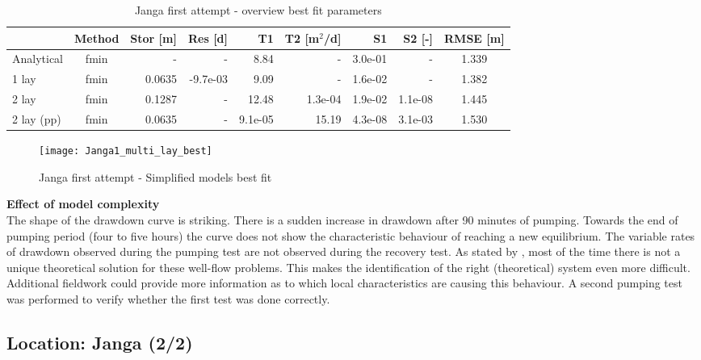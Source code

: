 \begin{table}[h!]
\small
\centering
\caption{Janga first attempt - overview best fit parameters}
\label{tab:Janga1_table}
\begin{tabular}{l|c|r|r|rr|rr|c}
\hline 
\textbf{}       & \textbf{Method} & \textbf{Stor [m]} & \textbf{Res [d]} & \textbf{T1}  & \textbf{T2   [m$^2$/d]}  & \textbf{S1}  & \textbf{S2 [-]}  & \textbf{RMSE [m]} \\ \hline \hline
Analytical                & fmin             & -             & -            & 8.84       & -          & 3.0e-01    & -          & 1.339 \\
1 lay                     & fmin             & 0.0635        & -9.7e-03     & 9.09       & -          & 1.6e-02    & -          & 1.382 \\
2 lay                     & fmin             & 0.1287        & -            & 12.48      & 1.3e-04    & 1.9e-02    & 1.1e-08    & 1.445 \\
2 lay (pp)                & fmin             & 0.0635        & -            & 9.1e-05    & 15.19      & 4.3e-08    & 3.1e-03    & 1.530 \\ \hline    
\end{tabular}
\end{table}

\begin{figure}[h!]
 \centering
 \texttt{[image: Janga1\_multi\_lay\_best]}
 \captionsetup{justification=centering} 
 \caption{Janga first attempt - Simplified models best fit}
 \label{fig:Janga1_best}
\end{figure}

\textbf{Effect of model complexity} \\
The shape of the drawdown curve is striking. There is a sudden increase in drawdown after 90 minutes of pumping. Towards the end of pumping period (four to five hours) the curve does not show the characteristic behaviour of reaching a new equilibrium. The variable rates of drawdown observed during the pumping test are not observed during the recovery test. As stated by \citet{Kruseman2000}, most of the time there is not a unique theoretical solution for these well-flow problems. This makes the identification of the right (theoretical) system even more difficult. Additional fieldwork could provide more information as to which local characteristics are causing this behaviour. A second pumping test was performed to verify whether the first test was done correctly.

\subsection{Location: Janga (2/2)}

